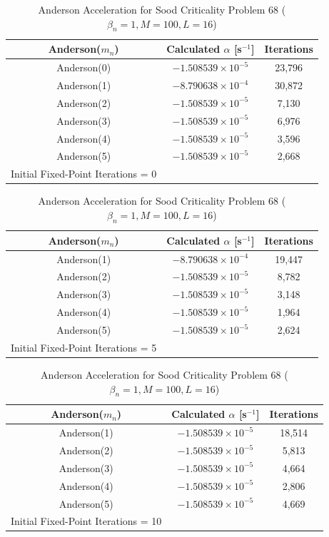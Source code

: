\begin{table}[!htbp]
\caption{Anderson Acceleration for Sood Criticality Problem 68 ($\beta_{n} = 1, M = 100, L = 16$)}
	\label{table:Sood68AA}
	\begin{subtable}[h]{1.0\textwidth}
	\centering{}
	\begin{tabular}{@{}ccc@{}}\toprule
	Anderson($m_{n}$) & Calculated $\alpha$ [s$^{-1}$] & Iterations \\
	\midrule
	Anderson(0) & $-1.508539 \times 10^{-5}$ & 23,796 \\
	Anderson(1) & $-8.790638 \times 10^{-4}$ & 30,872 \\
	Anderson(2) & $-1.508539 \times 10^{-5}$ & 7,130 \\
	Anderson(3) & $-1.508539 \times 10^{-5}$ & 6,976 \\
	Anderson(4) & $-1.508539 \times 10^{-5}$ & 3,596 \\
	Anderson(5) & $-1.508539 \times 10^{-5}$ & 2,668 \\
	\bottomrule
	Initial Fixed-Point Iterations = 0
	\end{tabular}
	\end{subtable}%
	\vspace{0.25cm}
	\begin{subtable}[h]{1.0\textwidth}
	\centering{}
	\begin{tabular}{@{}ccc@{}}\toprule
	Anderson($m_{n}$) & Calculated $\alpha$ [s$^{-1}$] & Iterations \\
	\midrule
	Anderson(1) & $-8.790638 \times 10^{-4}$ & 19,447 \\
	Anderson(2) & $-1.508539 \times 10^{-5}$ & 8,782 \\
	Anderson(3) & $-1.508539 \times 10^{-5}$ & 3,148 \\
	Anderson(4) & $-1.508539 \times 10^{-5}$ & 1,964 \\
	Anderson(5) & $-1.508539 \times 10^{-5}$ & 2,624 \\
	\bottomrule
	Initial Fixed-Point Iterations = 5
	\end{tabular}
	\end{subtable}%
	\vspace{0.25cm}
	\begin{subtable}[h]{1.0\textwidth}
	\centering{}
	\begin{tabular}{@{}ccc@{}}\toprule
	Anderson($m_{n}$) & Calculated $\alpha$ [s$^{-1}$] & Iterations \\
	\midrule
	Anderson(1) & $-1.508539 \times 10^{-5}$ & 18,514 \\
	Anderson(2) & $-1.508539 \times 10^{-5}$ & 5,813 \\
	Anderson(3) & $-1.508539 \times 10^{-5}$ & 4,664 \\
	Anderson(4) & $-1.508539 \times 10^{-5}$ & 2,806 \\
	Anderson(5) & $-1.508539 \times 10^{-5}$ & 4,669 \\
	\bottomrule
	Initial Fixed-Point Iterations = 10
	\end{tabular}
	\end{subtable}
\end{table}

